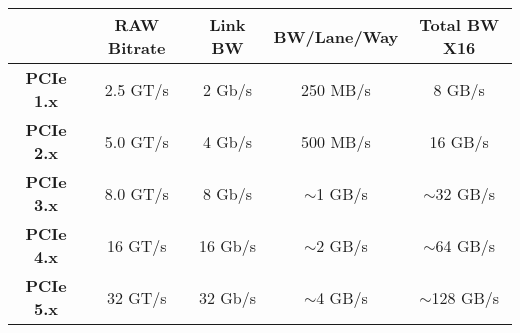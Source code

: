 \begin{tabular}{c|c|c|c|c|}
  \cline{2-5}
                                          & \textbf{RAW Bitrate} & \textbf{Link BW} & \textbf{BW/Lane/Way} & \textbf{Total BW X16} \\ \hline
  \multicolumn{1}{|c|}{\textbf{PCIe 1.x}} & 2.5 GT/s             & 2 Gb/s           & 250 MB/s             & 8 GB/s                \\ \hline
  \multicolumn{1}{|c|}{\textbf{PCIe 2.x}} & 5.0 GT/s             & 4 Gb/s           & 500 MB/s             & 16 GB/s               \\ \hline
  \multicolumn{1}{|c|}{\textbf{PCIe 3.x}} & 8.0 GT/s             & 8 Gb/s           & $\sim$1 GB/s         & $\sim$32 GB/s         \\ \hline
  \multicolumn{1}{|c|}{\textbf{PCIe 4.x}} & 16 GT/s              & 16 Gb/s          & $\sim$2 GB/s         & $\sim$64 GB/s         \\ \hline
  \multicolumn{1}{|c|}{\textbf{PCIe 5.x}} & 32 GT/s              & 32 Gb/s          & $\sim$4 GB/s         & $\sim$128 GB/s        \\ \hline
  \end{tabular}